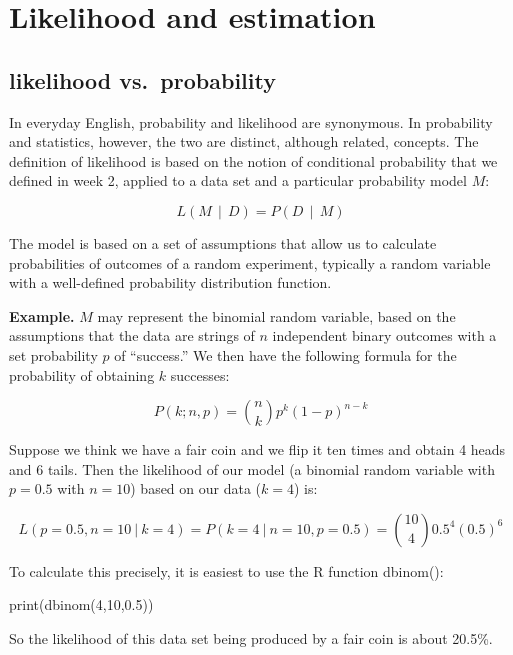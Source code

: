 \documentclass[
  letterpaper,
  DIV=11,
  numbers=noendperiod]{scrreprt}
\newenvironment{Shaded}{\begin{snugshade}}{\end{snugshade}}
\newcommand{\NormalTok}[1]{\textcolor[rgb]{0.00,0.23,0.31}{#1}}
\begin{document}
\section{Likelihood and estimation}\label{likelihood-and-estimation}

\subsection{likelihood
vs.~probability}\label{likelihood-vs.-probability}

In everyday English, probability and likelihood are synonymous. In
probability and statistics, however, the two are distinct, although
related, concepts. The definition of likelihood is based on the notion
of conditional probability that we defined in week 2, applied to a data
set and a particular probability model \(M\):

\[ 
L(M \ \ \vert \ \ D) = P(D \ \ \vert \ \ M)
\]

The model is based on a set of assumptions that allow us to calculate
probabilities of outcomes of a random experiment, typically a random
variable with a well-defined probability distribution function.

\textbf{Example.} \(M\) may represent the binomial random variable,
based on the assumptions that the data are strings of \(n\) independent
binary outcomes with a set probability \(p\) of ``success.'' We then
have the following formula for the probability of obtaining \(k\)
successes:

\[ 
P(k ; n , p) =  {n \choose k} p^k (1-p)^{n-k}
\]

Suppose we think we have a fair coin and we flip it ten times and obtain
4 heads and 6 tails. Then the likelihood of our model (a binomial random
variable with \(p=0.5\) with \(n=10\)) based on our data (\(k=4\)) is:

\[
L(p=0.5, n=10 \ \vert \ k=4 ) = P(k =4 \ \vert \ n=10 , p=0.5) = {10 \choose 4} 0.5^4 (0.5)^{6}
\]

To calculate this precisely, it is easiest to use the R function
dbinom():

\begin{Shaded}
\begin{Highlighting}[]
\NormalTok{print(dbinom(4,10,0.5))}
\end{Highlighting}
\end{Shaded}

So the likelihood of this data set being produced by a fair coin is
about 20.5\%.
\end{document}
